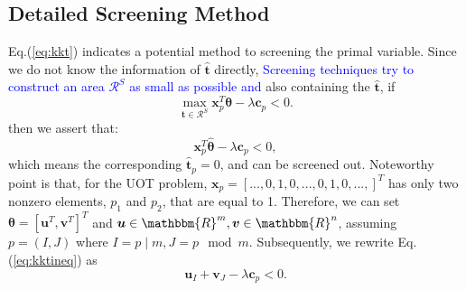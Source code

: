 \documentclass[twoside]{article}
\theoremstyle{plain}
\newcommand{\tranT}{T}
\newcommand{\R}{\mathbbm{R}}
\renewcommand{\vec}[1]{\bm{#1}}
\newcommand{\changeXS}[1]{\textcolor{blue}{#1}}
\begin{document}
\subsection{Detailed Screening Method}

Eq.(\ref{eq:kkt}) indicates a potential method to screening the primal variable. Since we do not know the information of $\hat{\vec{t}}$ directly, \changeXS{ Screening techniques try to construct an area $\mathcal{R}^{S}$  as small as possible and }also containing the $\hat{\vec{t}}$, if
\begin{equation}
\max_{\vec{t} \in \mathcal{R}^S} \vec{x}_p^{\tranT}\vec{\theta} -\lambda \vec{c}_p < 0.
\end{equation}
then we assert that:
 \begin{equation}
 \vec{x}_p^{\tranT}\hat{\vec{\theta}} -\lambda \vec{c}_p < 0,
 \label{eq:kktineq}
\end{equation}
which means the corresponding $\hat{\vec{t}}_p = 0$, and can be screened out. Noteworthy point is that, for the UOT problem, $\vec{x}_p = [...,0,1,0,...,0,1,0,...,]^{\tranT}$ has only two nonzero elements, $p_1$ and $p_2$, that are equal to 1. Therefore, we can set $\vec{\theta} = [\vec{u}^{\tranT},\vec{v}^{\tranT}]^{\tranT}$ and $\vec{u}\in\R^{m}, \vec{v}\in\R^{n}$, assuming $p=(I,J)$ where $I = p \mid m, J = p \mod m$. Subsequently, we rewrite Eq.(\ref{eq:kktineq}) as 
%
 \begin{equation}
\vec{u}_{I} + \vec{v}_{J}-\lambda \vec{c}_p < 0.
\end{equation}
\end{document}
